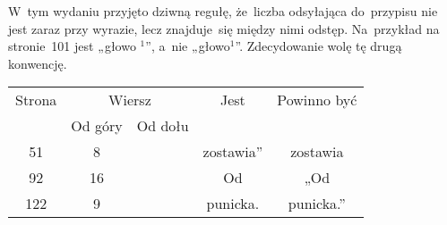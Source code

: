 \documentclass[a4paper,11pt]{article}
\begin{document}
\vspace{\spaceTwo}












\newpage


\vspace{0em}



\vspace{0em}


\noindent
W~tym wydaniu przyjęto dziwną regułę, że~liczba odsyłająca do~przypisu nie
jest zaraz przy wyrazie, lecz znajduje~się między nimi odstęp. Na~przykład
na stronie~101 jest „głowo $^{ 1 }$”, a~nie „głowo$^{ 1 }$”. Zdecydowanie
wolę tę drugą konwencję.



\vspace{\spaceTwo}












\newpage








\begin{center}

  \begin{tabular}{|c|c|c|c|c|}
    \hline
    Strona & \multicolumn{2}{c|}{Wiersz} & Jest
                              & Powinno być \\ \cline{2-3}
    & Od góry & Od dołu & & \\
    \hline
    \hphantom{0}51 & \hphantom{0}8 & & zostawia” & zostawia \\
    \hphantom{0}92 & 16 & & Od & „Od \\
    122 & \hphantom{0}9 & & punicka. & punicka.” \\
    \hline
  \end{tabular}

\end{center}
\end{document}
